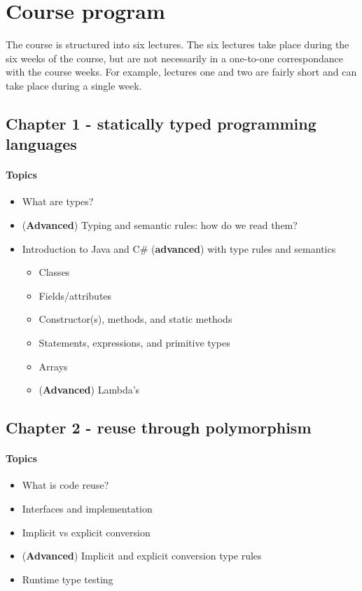 \section{Course program}
The course is structured into six lectures. The six lectures take place during the six weeks of the course, but are not necessarily in a one-to-one correspondance with the course weeks. For example, lectures one and two are fairly short and can take place during a single week.

\subsection{Chapter 1 - statically typed programming languages}
\paragraph*{Topics}
\begin{itemize}
	\item What are types?
	\item (\textbf{Advanced}) Typing and semantic rules: how do we read them?
	\item Introduction to Java and C\# (\textbf{advanced}) with type rules and semantics
	\begin{itemize}
		\item Classes
		\item Fields/attributes
		\item Constructor(s), methods, and static methods
		\item Statements, expressions, and primitive types
		\item Arrays
		\item (\textbf{Advanced}) Lambda's
	\end{itemize}
\end{itemize}


\subsection{Chapter 2 - reuse through polymorphism}

\paragraph*{Topics}			
\begin{itemize}
	\item What is code reuse?
	\item Interfaces and implementation
	\item Implicit vs explicit conversion
	\item (\textbf{Advanced}) Implicit and explicit conversion type rules
	\item Runtime type testing
\end{itemize}

